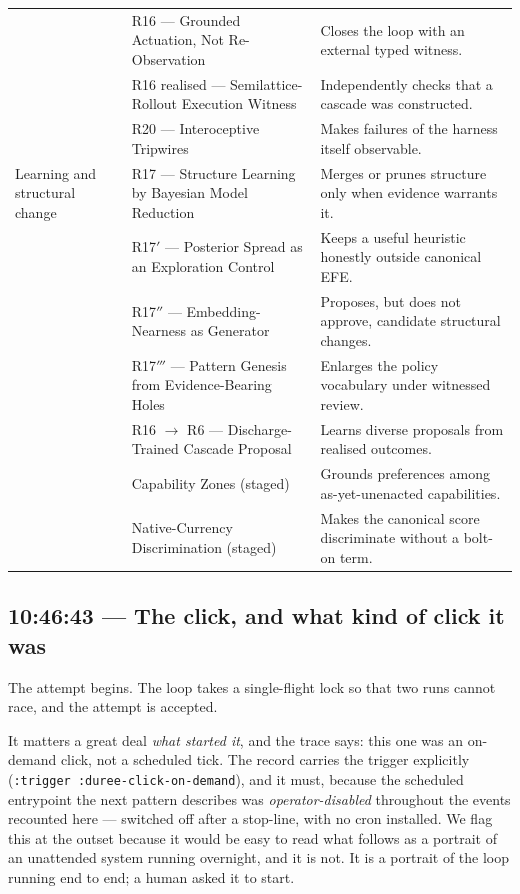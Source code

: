 \begin{longtable}{@{}>{\raggedright\arraybackslash}p{.16\linewidth}
                       >{\raggedright\arraybackslash}p{.39\linewidth}
                       >{\raggedright\arraybackslash}p{.39\linewidth}@{}}
 & R16 --- Grounded Actuation, Not Re-Observation & Closes the loop with an external typed witness. \\
 & R16 realised\apparatusmark{} --- Semilattice-Rollout Execution Witness & Independently checks that a cascade was constructed. \\
 & R20 --- Interoceptive Tripwires & Makes failures of the harness itself observable. \\
\addlinespace
Learning and structural change & R17 --- Structure Learning by Bayesian Model Reduction & Merges or prunes structure only when evidence warrants it. \\
 & R17$'$ --- Posterior Spread as an Exploration Control & Keeps a useful heuristic honestly outside canonical EFE. \\
 & R17$''$ --- Embedding-Nearness as Generator & Proposes, but does not approve, candidate structural changes. \\
 & R17$'''$ --- Pattern Genesis from Evidence-Bearing Holes & Enlarges the policy vocabulary under witnessed review. \\
 & R16 $\rightarrow$ R6 --- Discharge-Trained Cascade Proposal & Learns diverse proposals from realised outcomes. \\
 & Capability Zones (staged) & Grounds preferences among as-yet-unenacted capabilities. \\
 & Native-Currency Discrimination (staged) & Makes the canonical score discriminate without a bolt-on term. \\
\bottomrule
\end{longtable}
\endgroup
\fi

\subsection*{10:46:43 --- The click, and what kind of click it was}

The attempt begins.  The loop takes a single-flight lock so that two runs cannot
race, and the attempt is accepted.

It matters a great deal \emph{what started it}, and the trace says: this one was
an on-demand click, not a scheduled tick.  The record carries the trigger
explicitly (\texttt{:trigger :duree-click-on-demand}), and it must, because the
scheduled entrypoint the next pattern describes was \emph{operator-disabled}
throughout the events recounted here --- switched off after a stop-line, with
no cron installed.  We flag this at the outset because it would be easy to read
what follows as a portrait of an unattended system running overnight, and it is
not.  It is a portrait of the loop running end to end; a human asked it to
start.

